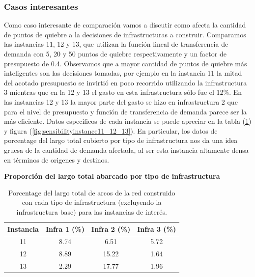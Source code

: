 \documentclass{article}
\begin{document}
  \subsubsection*{Casos interesantes}

  Como caso interesante de comparación vamos a discutir como afecta la cantidad de puntos de quiebre a la decisiones de infrastructuras a construir. Comparamos las instancias 11, 12 y 13, que utilizan la función lineal de transferencia de demanda con 5, 20 y 50 puntos de quiebre respectivamente y un factor de presupuesto de 0.4. Observamos que a mayor cantidad de puntos de quiebre más inteligentes son las decisiones tomadas, por ejemplo en la instancia 11 la mitad del acotado presupuesto se invirtió en poco recorrido utilizando la infrastructura 3 mientras que en la 12 y 13 el gasto en esta infrastructura sólo fue el 12\%. En las instancias 12 y 13 la mayor parte del gasto se hizo en infrastructura 2 que para el nivel de presupuesto y función de transferencia de demanda parece ser la más eficiente. Datos especificos de cada instancia se puede apreciar en la tabla (\ref{table:sensibilityinfralengths}) y figura (\ref{fig:sensibilityinstance11_12_13}). En particular, los datos de porcentage del largo total cubierto por tipo de infrastructura nos da una idea gruesa de la cantidad de demanda afectada, al ser esta instancia altamente densa en términos de origenes y destinos.

  \begin{table}[h!]
    \centering
    \caption*{{\bf Proporción del largo total abarcado por tipo de infrastructura}}
    \begin{tabular}{cccc}
      \toprule
        Instancia & Infra 1 (\%) & Infra 2 (\%) & Infra 3 (\%) \\
      \midrule
        11 & 8.74  & 6.51   & 5.72 \\
        12 & 8.89  & 15.22  & 1.64 \\
        13 & 2.29  & 17.77  & 1.96 \\
      \bottomrule
    \end{tabular}
      \caption{Porcentage del largo total de arcos de la red construido con cada tipo de infrastructura (excluyendo la infrastructura base) para las instancias de interés.}\label{table:sensibilityinfralengths}
  \end{table}
\end{document}
